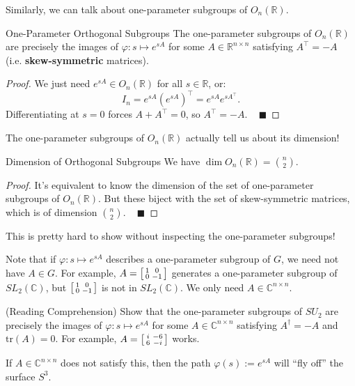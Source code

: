 Similarly, we can talk about one-parameter subgroups of $O_n(\mathbb{R})$.

\begin{theorem}{One-Parameter Orthogonal Subgroups}
    The one-parameter subgroups of $O_n(\mathbb{R})$ are precisely the images of $\varphi: s \mapsto e^{sA}$ for some $A \in \mathbb{R}^{n \times n}$ satisfying $A^{\top} = -A$ (i.e. \textbf{skew-symmetric} matrices).
\end{theorem}

\begin{proof}
    We just need $e^{sA} \in O_n(\mathbb{R})$ for all $s \in \mathbb{R}$, or:
    \[ I_n = e^{sA}(e^{sA})^{\top} = e^{sA} e^{s A^{\top}}. \]
    Differentiating at $s = 0$ forces $A + A^{\top} = 0$, so $A^{\top} = -A$. ~ $\blacksquare$
\end{proof}

The one-parameter subgroups of $O_n(\mathbb{R})$ actually tell us about its dimension!

\begin{theorem}{Dimension of Orthogonal Subgroups}
    We have $\dim O_n(\mathbb{R}) = \binom{n}{2}$.
\end{theorem}

\begin{proof}
    It's equivalent to know the dimension of the set of one-parameter subgroups of $O_n(\mathbb{R})$.  But these biject with the set of skew-symmetric matrices, which is of dimension $\binom{n}{2}$. ~ $\blacksquare$
\end{proof}

\begin{remark}
    This is pretty hard to show without inspecting the one-parameter subgroups!
\end{remark}

Note that if $\varphi: s \mapsto e^{sA}$ describes a one-parameter subgroup of $G$, we need not have $A \in G$.  For example, $A = \begin{bsmallmatrix} 1 & 0 \\ 0 & -1 \end{bsmallmatrix}$ generates a one-parameter subgroup of $SL_2(\mathbb{C})$, but $\begin{bsmallmatrix} 1 & 0 \\ 0 & -1 \end{bsmallmatrix}$ is not in $SL_2(\mathbb{C})$.  We only need $A \in \mathbb{C}^{n \times n}$.

\begin{remark}
    (Reading Comprehension) Show that the one-parameter subgroups of $SU_2$ are precisely the images of $\varphi: s \mapsto e^{sA}$ for some $A \in \mathbb{C}^{n \times n}$ satisfying $A^{\dagger} = -A$ and $\mathrm{tr}(A) = 0$.  For example, $A = \begin{bsmallmatrix} i & -6 \\ 6 & -i \end{bsmallmatrix}$ works.

    If $A \in \mathbb{C}^{n \times n}$ does not satisfy this, then the path $\varphi(s) := e^{sA}$ will ``fly off'' the surface $S^3$.
\end{remark}

